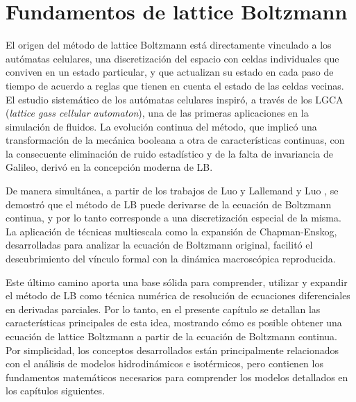 \chapter{Fundamentos de lattice Boltzmann}
\label{chap:fundamentos}

El origen del m\'etodo de lattice Boltzmann est\'a directamente vinculado a los aut\'omatas celulares, una discretizaci\'on del espacio con celdas individuales que conviven en un estado particular, y que actualizan su estado en cada paso de tiempo de acuerdo a reglas que tienen en cuenta el estado de las celdas vecinas. El estudio sistem\'atico de los aut\'omatas celulares inspir\'o, a trav\'es de los LGCA (\emph{lattice gass cellular automaton}), una de las primeras aplicaciones en la simulaci\'on de fluidos. La evoluci\'on continua del m\'etodo, que implic\'o una transformaci\'on de la mec\'anica booleana a otra de caracter\'isticas continuas, con la consecuente eliminaci\'on de ruido estad\'istico y de la falta de invariancia de Galileo, deriv\'o en la concepci\'on moderna de LB.

De manera simult\'anea, a partir de los trabajos de Luo \cite{luo_unified_1998} y Lallemand y Luo \cite{lallemand_theory_2000}, se demostr\'o que el m\'etodo de LB puede derivarse de la ecuaci\'on de Boltzmann continua, y por lo tanto corresponde a una discretizaci\'on especial de la misma. La aplicaci\'on de t\'ecnicas multiescala como la expansi\'on de Chapman-Enskog, desarrolladas para analizar la ecuaci\'on de Boltzmann original, facilit\'o el descubrimiento del v\'inculo formal con la din\'amica macrosc\'opica reproducida.

Este \'ultimo camino aporta una base s\'olida para comprender, utilizar y expandir el m\'etodo de LB como t\'ecnica num\'erica de resoluci\'on de ecuaciones diferenciales en derivadas parciales. Por lo tanto, en el presente cap\'itulo se detallan las caracter\'isticas principales de esta idea, mostrando c\'omo es posible obtener una ecuaci\'on de lattice Boltzmann a partir de la ecuaci\'on de Boltzmann continua. Por simplicidad, los conceptos desarrollados est\'an principalmente relacionados con el an\'alisis de modelos hidrodin\'amicos e isot\'ermicos, pero contienen los fundamentos matem\'aticos necesarios para comprender los modelos detallados en los cap\'itulos siguientes.
\newpage

